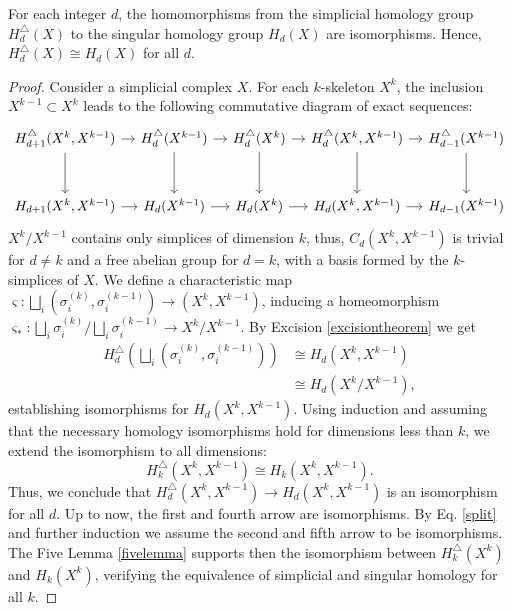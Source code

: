 \begin{theorem}{\cite[Theorem 2.27]{hatcher2005algebraic}}
	For each integer $d$, the homomorphisms from the simplicial homology group
	$H^{\triangle}_{d}(X)$ to the singular homology group $H_{d}(X)$ are isomorphisms.
	Hence, $H_{d}^{\triangle}(X) \cong H_{d}(X)$ for all $d$.
\end{theorem}

\begin{proof}
	Consider a simplicial complex $X$. For each $k$-skeleton $X^{k}$, the inclusion $X^{k-1} \subset X^{k}$ leads to the following commutative diagram of exact sequences:
	\begin{equation*}		
		\begin{tikzcd}[row sep=3em, column sep = 1em]
			H^\triangle_{d+1}(X^k,X^{k-1}) \arrow[d] \arrow[r] & H^\triangle_{d}(X^{k-1}) \arrow[d] \arrow[r] & H^\triangle_{d}(X^k) \arrow[d] \arrow[r] & H^\triangle_{d}(X^k,X^{k-1}) \arrow[d] \arrow[r] & H^\triangle_{d-1}(X^{k-1}) \arrow[d] \\
			H_{d+1}(X^k,X^{k-1}) \arrow[r] & H_{d}(X^{k-1}) \arrow[r] & H_{d}(X^k) \arrow[r] & H_{d}(X^k,X^{k-1}) \arrow[r] & H_{d-1}(X^{k-1})
		\end{tikzcd}
	\end{equation*}			
	$X^{k}/X^{k-1}$ contains only simplices of dimension $k$, thus, $C_{d}(X^{k}, X^{k-1})$ is trivial for $d \neq k$ and a free abelian group for $d = k$, with a basis formed by the $k$-simplices of $X$. We define a characteristic map $\varsigma: \bigsqcup_{i}(\sigma^{(k)}_{i}, \sigma^{(k-1)}_{i}) \rightarrow (X^{k}, X^{k-1})$, inducing a homeomorphism $\varsigma_\ast: \bigsqcup_{i} \sigma^{(k)}_{i}/\bigsqcup_{i} \sigma^{(k-1)}_{i} \rightarrow X^{k}/X^{k-1}$. By Excision \ref{excisiontheorem} we get 
	\begin{align}
		\label{split}
		H^\triangle_{d}\left(\bigsqcup_{i} (\sigma^{(k)}_{i}, \sigma^{(k-1)}_{i})\right) &\cong H_{d}(X^{k}, X^{k-1}) \nonumber\\
		&\cong H_{d}(X^{k}/X^{k-1}),
	\end{align}
	establishing isomorphisms for $H_{d}(X^{k}, X^{k-1})$. Using induction and assuming that the necessary homology isomorphisms hold for dimensions less than $k$, we extend the isomorphism to all dimensions:
	\begin{equation}
		H_{k}^{\triangle}(X^{k},X^{k-1}) \cong H_{k}(X^{k},X^{k-1}).
	\end{equation}
	 Thus, we conclude that $H_{d}^{\triangle}(X^{k}, X^{k-1}) \rightarrow H_{d}(X^{k}, X^{k-1})$ is an isomorphism for all $d$. Up to now, the first and fourth arrow are isomorphisms. By Eq. \ref{split} and further induction we assume the second and fifth arrow to be isomorphisms. The Five Lemma \ref{fivelemma} supports then the isomorphism between $H_{k}^{\triangle}(X^{k})$ and $H_{k}(X^{k})$, verifying the equivalence of simplicial and singular homology for all $k$.
\end{proof}